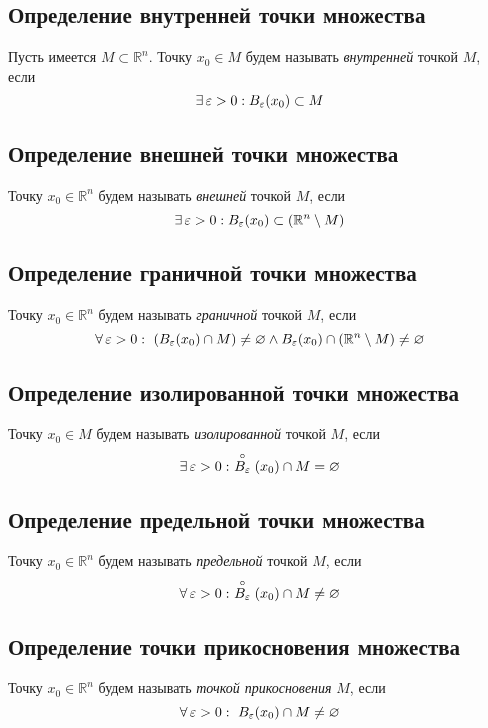 \documentclass[a4paper]{article}
\begin{document}

\subsection{Определение внутренней точки множества}
 Пусть имеется $M\subset\mathbb{R}^n$. Точку $x_0\in M$ будем называть \textit{внутренней} точкой $M$, если $$\exists\operatorname{\varepsilon}>0:B_{\operatorname{\varepsilon}}(x_0)\subset M$$

\subsection{Определение внешней точки множества}
 Точку $x_0\in \mathbb{R}^n$ будем называть \textit{внешней} точкой $M$, если $$\exists\operatorname{\varepsilon}>0:B_{\operatorname{\varepsilon}}(x_0)\subset (\mathbb{R}^n\setminus M)$$

\subsection{Определение граничной точки множества}
 Точку $x_0\in\mathbb{R}^n$ будем называть \textit{граничной} точкой $M$, если $$\forall \ve>0:\ \left(B_{\ve}(x_0)\cap M\right)\ne\varnothing\wedge B_{\ve}(x_0)\cap(\mathbb{R}^n\setminus M)\ne\varnothing$$ 

\subsection{Определение изолированной точки множества}
 Точку $x_0\in M$ будем называть \textit{изолированной} точкой $M$, если $$\exists \ve>0:\ \stackrel{\circ}{B_{\ve}}(x_0)\cap M=\varnothing$$ 

\subsection{Определение предельной точки множества}
 Точку $x_0\in\mathbb{R}^n$ будем называть \textit{предельной} точкой $M$, если $$\forall \ve>0:\ \stackrel{\circ}{B_{\ve}}(x_0)\cap M\ne\varnothing$$ 

\subsection{Определение точки прикосновения множества}
 Точку $x_0\in\mathbb{R}^n$ будем называть \textit{точкой прикосновения} $M$, если $$\forall \operatorname{\varepsilon}>0:\ B_{\operatorname{\varepsilon}}(x_0)\cap M\ne\varnothing$$ 
\end{document}

